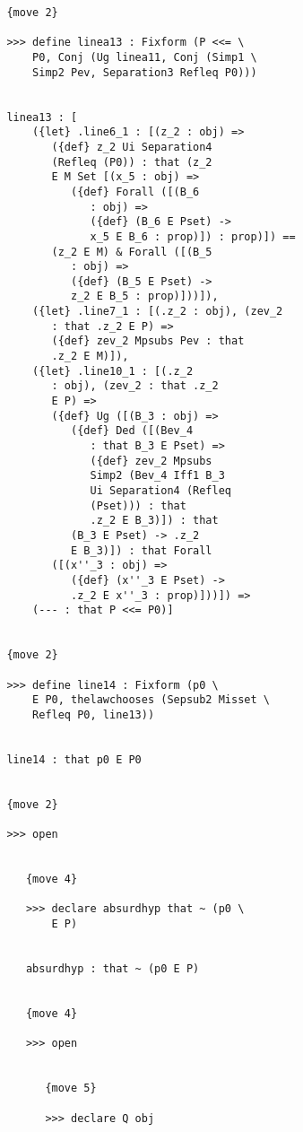 \documentclass[12pt]{article}
\begin{document}
\begin{verbatim}
         {move 2}

         >>> define linea13 : Fixform (P <<= \
             P0, Conj (Ug linea11, Conj (Simp1 \
             Simp2 Pev, Separation3 Refleq P0)))


         linea13 : [
             ({let} .line6_1 : [(z_2 : obj) => 
                ({def} z_2 Ui Separation4 
                (Refleq (P0)) : that (z_2 
                E M Set [(x_5 : obj) => 
                   ({def} Forall ([(B_6 
                      : obj) => 
                      ({def} (B_6 E Pset) -> 
                      x_5 E B_6 : prop)]) : prop)]) == 
                (z_2 E M) & Forall ([(B_5 
                   : obj) => 
                   ({def} (B_5 E Pset) -> 
                   z_2 E B_5 : prop)]))]), 
             ({let} .line7_1 : [(.z_2 : obj), (zev_2 
                : that .z_2 E P) => 
                ({def} zev_2 Mpsubs Pev : that 
                .z_2 E M)]), 
             ({let} .line10_1 : [(.z_2 
                : obj), (zev_2 : that .z_2 
                E P) => 
                ({def} Ug ([(B_3 : obj) => 
                   ({def} Ded ([(Bev_4 
                      : that B_3 E Pset) => 
                      ({def} zev_2 Mpsubs 
                      Simp2 (Bev_4 Iff1 B_3 
                      Ui Separation4 (Refleq 
                      (Pset))) : that 
                      .z_2 E B_3)]) : that 
                   (B_3 E Pset) -> .z_2 
                   E B_3)]) : that Forall 
                ([(x''_3 : obj) => 
                   ({def} (x''_3 E Pset) -> 
                   .z_2 E x''_3 : prop)]))]) => 
             (--- : that P <<= P0)]


         {move 2}

         >>> define line14 : Fixform (p0 \
             E P0, thelawchooses (Sepsub2 Misset \
             Refleq P0, line13))


         line14 : that p0 E P0


         {move 2}

         >>> open


            {move 4}

            >>> declare absurdhyp that ~ (p0 \
                E P)


            absurdhyp : that ~ (p0 E P)


            {move 4}

            >>> open


               {move 5}

               >>> declare Q obj



\end{verbatim}
\end{document}

